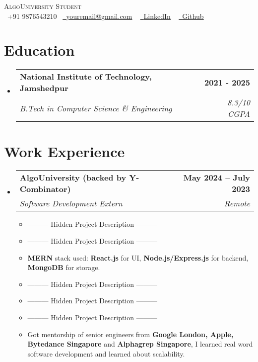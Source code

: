 \documentclass[letterpaper,11pt]{article}
\makeatletter
\newcommand{\resumeItem}[1]{
  \item\small{
    {#1 \vspace{-2pt}}
  }
}
\newcommand{\resumeSubheading}[4]{
  \vspace{-2pt}\item
    \begin{tabular*}{1.0\textwidth}[t]{l@{\extracolsep{\fill}}r}
      \textbf{#1} & \textbf{\small #2} \\
      \textit{\small#3} & \textit{\small #4} \\
    \end{tabular*}\vspace{-7pt}
}
\newcommand{\resumeSubHeadingListStart}{\begin{itemize}[leftmargin=0.0in, label={}]}
\newcommand{\resumeSubHeadingListEnd}{\end{itemize}}
\newcommand{\resumeItemListStart}{\begin{itemize}}
\newcommand{\resumeItemListEnd}{\end{itemize}\vspace{-5pt}}
\makeatother
\begin{document}
\begin{center}
  {\Huge \scshape AlgoUniversity Student} \\ \vspace{5pt}
  \small \raisebox{-0.1\height}\faPhone\ +91 9876543210~ \href{mailto:admissions@algouniversity.com.com}{\raisebox{-0.2\height}\faEnvelope\  \underline{youremail@gmail.com}} ~
  \href{https://algouniversity.com/accelerator}{\raisebox{-0.2\height}\faLinkedin\ \underline{LinkedIn}}  ~
  \href{https://bit.ly/accelerator-2023}{\raisebox{-0.2\height}\faGithub\ \underline{Github}}
  \vspace{-8pt}
\end{center}

\vspace{-10pt}
\section{Education}
\resumeSubHeadingListStart
\resumeSubheading
{National Institute of Technology, Jamshedpur}{2021 - 2025}{B.Tech in Computer Science \& Engineering}{8.3/10 CGPA}
\resumeSubHeadingListEnd
\vspace{-15pt}



\section{Work Experience}
\resumeSubHeadingListStart

\resumeSubheading
{AlgoUniversity (backed by Y-Combinator)}{May 2024 -- July 2023}
{Software Development Extern}{Remote}
\resumeItemListStart
\resumeItem{  ---------  Hidden Project Description  ---------  }
\resumeItem{  ---------  Hidden Project Description  ---------  }

\resumeItem{\textbf{MERN} stack used: \textbf{React.js} for UI,         \textbf{Node.js/Express.js} for backend, \textbf{MongoDB} for storage.}

\resumeItem{  ---------  Hidden Project Description  ---------  }
\resumeItem{  ---------  Hidden Project Description  ---------  }

\resumeItem{  ---------  Hidden Project Description  ---------  }

\resumeItem{Got mentorship of senior engineers from \textbf{Google London, Apple, Bytedance Singapore} and \textbf{Alphagrep Singapore}, I learned real word software development and learned about scalability.}
\resumeItemListEnd
\resumeSubHeadingListEnd
\vspace{-16pt}
\end{document}
